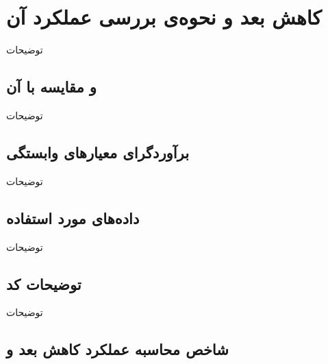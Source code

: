 \chapter{
کاهش بعد و نحوه‌ی بررسی عملکرد آن
}
توضیحات

\section{
و مقایسه با آن
}
توضیحات
\section{
برآوردگر‌ای معیارهای وابستگی
}
توضیحات
\section{
داده‌های مورد استفاده
}
توضیحات
\section{
توضیحات کد
}
توضیحات
\section{
شاخص محاسبه عملکرد کاهش بعد و 
}

